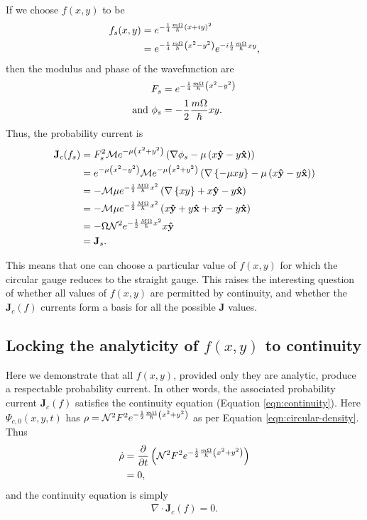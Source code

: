 If we choose $f(x,y)$ to be
\begin{align}
    f_s(x,y) &= e^{- \frac{1}{4} \frac{m \Omega}{\hbar} \left( x + i y \right)^2} \\
             &= e^{- \frac{1}{4} \frac{m \Omega}{\hbar} \left( x^2 - y^2 \right)}
                e^{-i \frac{1}{2} \frac{m \Omega}{\hbar} xy},
\end{align}
then the modulus and phase of the wavefunction are
\begin{align}
    F_s &= e^{- \frac{1}{4} \frac{m \Omega}{\hbar} \left( x^2 - y^2 \right)} \\
    \mathrm{and}~ \phi_s &= -\frac{1}{2} \frac{m \Omega}{\hbar} xy.
\end{align}
Thus, the probability current is
\begin{align}
    \mathbf{J}_c(f_s)
    &= F_s^2 \mathcal{M} e^{- \mu \left( x^2 + y^2 \right)}
       \left( \nabla \phi_s - \mu \left( x\mathbf{\hat y } -
       y\mathbf{\hat x } \right) \right) \\
    &= e^{- \mu \left( x^2 - y^2 \right)} \mathcal{M} e^{- \mu \left( x^2 + y^2
       \right)} \left( \nabla \left\{ - \mu xy \right\} - \mu \left( x\mathbf{\hat y } - y
       \mathbf{\hat x } \right) \right) \\
    &= - \mathcal{M} \mu e^{- \frac{1}{2} \frac{M
       \Omega}{\hbar} x^2} \left( \nabla \left\{ xy \right\} + x\mathbf{\hat y } -
       y\mathbf{\hat x } \right) \\
    &= - \mathcal{M} \mu e^{- \frac{1}{2} \frac{M
       \Omega}{\hbar} x^2} \left( x\mathbf{\hat y } + y\mathbf{\hat x } + x\mathbf{\hat y } -
       y\mathbf{\hat x } \right) \\
    &= - \Omega \mathcal{N}^2  e^{- \frac{1}{2} \frac{M \Omega}{\hbar} x^2}
       x\mathbf{\hat y } \\
       &= \mathbf{J}_s.
\end{align}

This means that one can choose a particular value of $f(x,y)$ for which the
circular gauge reduces to the straight gauge. This raises the interesting
question of whether all values of $f(x,y)$ are permitted by continuity, and
whether the $\mathbf{J}_c(f)$ currents form a basis for all the possible
$\mathbf{J}$ values.

\subsection{Locking the analyticity of $f(x,y)$ to continuity}

Here we demonstrate that all $f(x,y)$, provided only they are analytic, produce
a respectable probability current. In other words, the associated
probability current $\mathbf{J}_c(f)$ satisfies the continuity equation
(Equation \ref{eqn:continuity}). Here $\Psi_{c,0}(x, y, t)$ has $\rho =
\mathcal{N}^2 F^2 e^{- \frac{1}{2} \frac{m \Omega}{\hbar} \left( x^2 + y^2 \right)}$ as per
Equation \ref{eqn:circular-density}. Thus
\begin{align}
    \dot \rho &= \frac{\partial}{\partial t} \left( \mathcal{N}^2 F^2 e^{-
        \frac{1}{2} \frac{m \Omega}{\hbar} \left( x^2 + y^2 \right)} \right) \\
    &= 0,
\end{align}
and the continuity equation is simply
\begin{align}
    \nabla \cdot \mathbf{J}_c(f) = 0.
\end{align}

